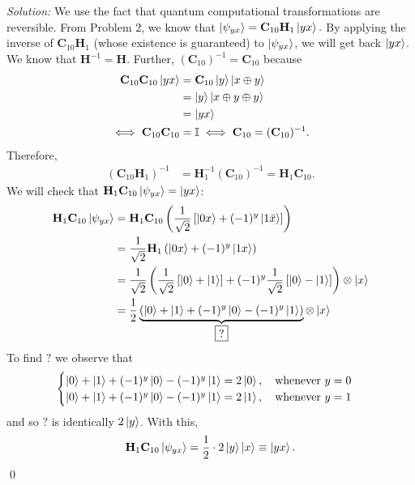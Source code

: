 \documentclass{book}
\theoremstyle{definition}
\newcommand{\nn}{\nonumber}
\newcommand{\f}[2]{\frac{#1}{#2}}
\newcommand{\lp}{\left(}
\newcommand{\rp}{\right)}
\newcommand{\lb}{\left[}
\newcommand{\rb}{\right]}
\newcommand{\Id}{\mathbb{I}}
\newcommand{\had}{\mathbf{H}}
\begin{document}
\noindent \textit{Solution:} We use the fact that quantum computational transformations are reversible. From Problem 2, we know that $\ket{\psi_{yx}} = \mathbf{C}_{10}\had_1 \ket{yx}.$  By applying the inverse of $\mathbf{C}_{10}\had_1$ (whose existence is guaranteed) to $\ket{\psi_{yx}}$, we will get back $\ket{yx}$. We know that $\had^{-1} = \had$. Further, $(\mathbf{C}_{10})^{-1} = \mathbf{C}_{10}$ because
\begin{align}
\mathbf{C}_{10}\mathbf{C}_{10} \ket{yx} &= \mathbf{C}_{10}\ket{y}\ket{x\oplus y}\nn\\ 
&= \ket{y}\ket{x\oplus y \oplus y} \nn\\
&=\ket{yx} \nn\\
\iff \mathbf{C}_{10}\mathbf{C}_{10} &= \Id \iff \mathbf{C}_{10} = (\mathbf{C}_{10})^{-1}.
\end{align}
Therefore, 
\begin{align}
(\mathbf{C}_{10}\had_1)^{-1} &= \had_1^{-1}(\mathbf{C}_{10})^{-1} = \had_1 \mathbf{C}_{10}.
\end{align}
We will check that $\had_1 \mathbf{C}_{10}\ket{\psi_{yx}} = \ket{yx}$:
\begin{align}
\had_1 \mathbf{C}_{10}\ket{\psi_{yx}} &= \had_1 \mathbf{C}_{10}\lp \f{1}{\sqrt{2}}\lb \ket{0x} + (-1)^{y}\ket{1\bar{x}} \rb \rp\nn\\
&= \f{1}{\sqrt{2}} \had_1 \lp \ket{0x} + (-1)^y \ket{1x}  \rp\nn\\
&= \f{1}{\sqrt{2}} \lp \f{1}{\sqrt{2}}\lb \ket{0} + \ket{1}  \rb  + (-1)^y \f{1}{\sqrt{2}} \lb \ket{0} - \ket{1} \rb \rp \otimes \ket{x}\nn\\
&= \f{1}{2}\underbrace{\lp \ket{0} + \ket{1} + (-1)^{y}\ket{0} - (-1)^y\ket{1}  \rp}_{\boxed{?}} \otimes \ket{x}
\end{align}
To find $\boxed{?}$ we observe that
\begin{align}
\begin{cases}
\ket{0} + \ket{1} + (-1)^{y}\ket{0} - (-1)^y\ket{1} = 2\ket{0}, \quad \text{whenever } y = 0\\
\ket{0} + \ket{1} + (-1)^{y}\ket{0} - (-1)^y\ket{1} = 2\ket{1}, \quad \text{whenever }  y = 1
\end{cases}
\end{align}
and so $\boxed{?}$ is identically $2\ket{y}$. With this, 
\begin{align}
\had_1 \mathbf{C}_{10}\ket{\psi_{yx}} = \f{1}{2}\cdot 2\ket{y}\ket{x} \equiv \ket{yx}.
\end{align}\qed
\end{document}
